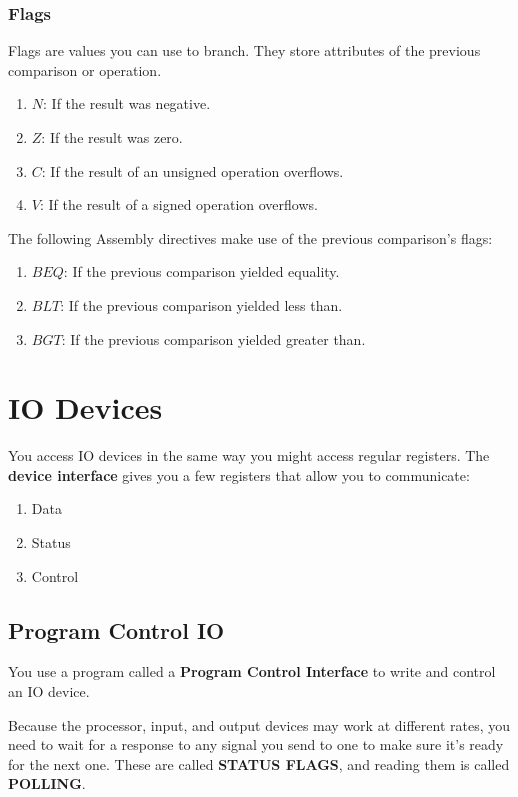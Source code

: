 \documentclass[a4paper,12pt]{report}
\begin{document}
\subsection{Flags}
Flags are values you can use to branch. They store attributes of the previous comparison or operation.
\begin{enumerate}
\item $N$: If the result was negative.
\item $Z$: If the result was zero.
\item $C$: If the result of an unsigned operation overflows. 
\item $V$: If the result of a signed operation overflows.
\end{enumerate}

The following Assembly directives make use of the previous comparison's flags:
\begin{enumerate}
\item $BEQ$: If the previous comparison yielded equality.
\item $BLT$: If the previous comparison yielded less than.
\item $BGT$: If the previous comparison yielded greater than.
\end{enumerate}



\chapter{IO Devices}
You access IO devices in the same way you might access regular registers. The \textbf{device interface} gives you a few registers that 
allow you to communicate:
\begin{enumerate}
\item Data
\item Status
\item Control
\end{enumerate}

\section{Program Control IO}
You use a program called a \textbf{Program Control Interface} to write and control an IO device. 

Because the processor, input, and output devices may work at different rates, you need to wait for a response to any signal you 
send to one to make sure it's ready for the next one. These are called \textbf{STATUS FLAGS}, and reading them is called \textbf{POLLING}. 
\end{document}
